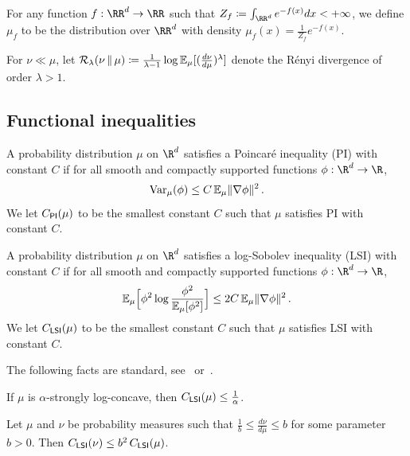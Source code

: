 For any function $f:\RR^d\to\RR$ such that $Z_f\deq \int_{\RR^d} e^{-f(x)}dx<+\infty$, we define $\mu_f$ to be the distribution over $\RR^d$ with density $\mu_f(x)=\frac{1}{Z_f}e^{-f(x)}$.

For $\nu \ll \mu$, let $\Ren[\lambda]{\nu}{\mu} \deq \frac{1}{\lambda-1} \log \En_\mu[(\frac{d\nu}{d\mu})^\lambda]$ denote the R\'enyi divergence of order $\lambda > 1$.


\subsection{Functional inequalities}


\begin{definition}[PI]\label{def:PI}
A probability distribution $\mu$ on $\R^d$ satisfies a Poincar\'e inequality (PI) with constant $C$ if for all smooth and compactly supported functions $\phi:\R^d\to \R$,
\begin{align*}
    \var_\mu(\phi)\leq C\En_\mu \nrm{\nabla \phi}^2\,.
\end{align*}
We let $\CPI(\mu)$ to be the smallest constant $C$ such that $\mu$ satisfies PI with constant $C$.
\end{definition}

\begin{definition}[LSI]\label{def:LSI}
A probability distribution $\mu$ on $\R^d$ satisfies a log-Sobolev inequality (LSI) with constant $C$ if for all smooth and compactly supported functions $\phi:\R^d\to \R$,
\begin{align*}
    \En_\mu\brk[\Big]{ \phi^2 \log \frac{\phi^2}{\En_\mu[\phi^2]}}\leq 2C\En_\mu \nrm{\nabla \phi}^2\,.
\end{align*}
We let $\CLSI(\mu)$ to be the smallest constant $C$ such that $\mu$ satisfies LSI with constant $C$.
\end{definition}

The following facts are standard, see~\citet{BGL14} or~\citet[Chapter 2]{Chewi26Book}.

\begin{lemma}\label{lem:LSI-SC}
If $\mu$ is $\alpha$-strongly log-concave, then $\CLSI(\mu)\leq \frac{1}{\alpha}$.
\end{lemma}

\begin{lemma}\label{lem:HS-perturb}
Let $\mu$ and $\nu$ be probability measures such that $\frac{1}{b}\leq \frac{d\nu}{d\mu}\leq b$ for some parameter $b>0$. Then $\CLSI(\nu)\leq b^2\,\CLSI(\mu)$.
\end{lemma}





